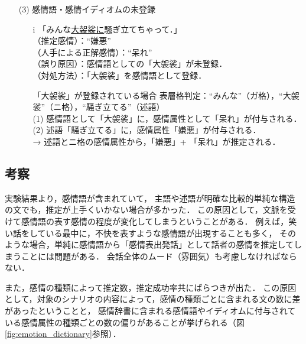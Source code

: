 \documentclass[japanese]{jnlp_1.3c}
\begin{document}
\begin{itemize}
\begin{itemize}
\end{itemize}

\item [(3)] 感情語・感情イディオムの未登録
\begin{itemize}
\item [i] 「みんな\underline{大袈裟に}騒ぎ立てちゃって．」\\
\hspace{0.3cm}（推定感情）：“嫌悪”\\
\hspace{0.3cm}（人手による正解感情）：“呆れ”\\
\hspace{0.3cm}（誤り原因）：感情語としての「大袈裟」が未登録．\\
\hspace{0.3cm}（対処方法）：「大袈裟」を感情語として登録．\\
\begin{itembox}{「大袈裟」が登録されている場合}
表層格判定：“みんな”（ガ格），“大袈裟”（ニ格），“騒ぎ立てる”（述語）\\
(1) 感情語として「大袈裟」に，感情属性として「呆れ」が付与される． \\
(2) 述語「騒ぎ立てる」に，感情属性「嫌悪」が付与される．\\
→ 述語とニ格の感情属性から，「嫌悪」+ 「呆れ」が推定される．
\end{itembox}
\end{itemize}
\end{itemize}

\subsection{考察}

実験結果より，感情語が含まれていて，
主語や述語が明確な比較的単純な構造の文でも，推定が上手くいかない場合が多かった．
この原因として，文脈を受けて感情語の表す感情の程度が変化してしまうということがある．
例えば，笑い話をしている最中に，不快を表すような感情語が出現することも多く，
そのような場合，単純に感情語から「感情表出発話」として話者の感情を推定してしまうことには問題がある．
会話全体のムード（雰囲気）も考慮しなければならない．

また，感情の種類によって推定数，推定成功率共にばらつきが出た．
この原因として，対象のシナリオの内容によって，感情の種類ごとに含まれる文の数に差があったということと，
感情辞書に含まれる感情語やイディオムに付与されている感情属性の種類ごとの数の偏りがあることが挙げられる（図\ref{fig:emotion_dictionary}参照）．
\end{document}
